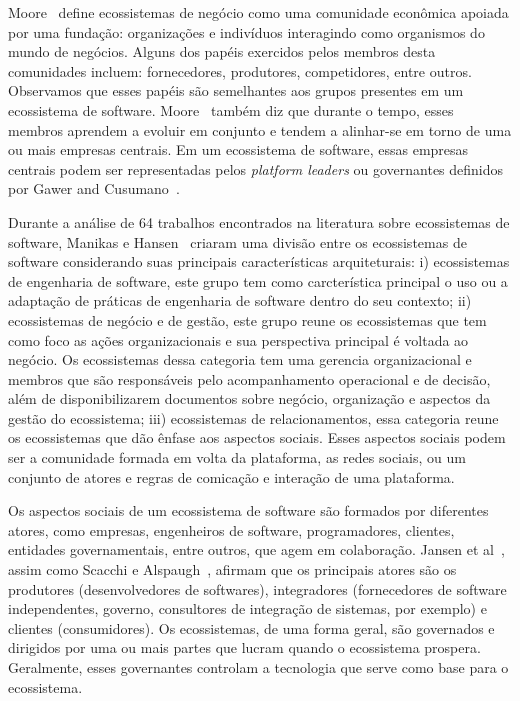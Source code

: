 \documentclass[conference]{IEEEtran}
\begin{document}
Moore~\cite{Moore1996} define ecossistemas de negócio como uma comunidade econômica apoiada por uma fundação: organizações e indivíduos interagindo como organismos do mundo de negócios. Alguns dos papéis exercidos pelos membros desta comunidades incluem: fornecedores, produtores, competidores, entre outros. Observamos que esses papéis são semelhantes aos grupos presentes em um ecossistema de software. Moore~\cite{Moore1996} também diz que durante o tempo, esses membros aprendem a evoluir em conjunto e tendem a alinhar-se em torno de uma ou mais empresas centrais. Em um ecossistema de software, essas empresas centrais podem ser representadas pelos \emph{platform leaders} ou governantes definidos por Gawer and Cusumano~\cite{Gawer2002}.

Durante a análise de 64 trabalhos encontrados na literatura sobre ecossistemas de software, Manikas e Hansen~\cite{Manikas2013} criaram uma divisão entre os ecossistemas de software considerando suas principais características arquiteturais: i) ecossistemas de engenharia de software, este grupo tem como carcterística principal o uso ou a adaptação de práticas de engenharia de software dentro do seu contexto; ii) ecossistemas de negócio e de gestão, este grupo reune os ecossistemas que tem como foco as ações organizacionais e sua perspectiva principal é voltada ao negócio. Os ecossistemas dessa categoria tem uma gerencia organizacional e membros que são responsáveis pelo acompanhamento operacional e de decisão, além de disponibilizarem documentos sobre negócio, organização e aspectos da gestão do ecossistema; iii) ecossistemas de relacionamentos, essa categoria reune os ecossistemas que dão ênfase aos aspectos sociais. Esses aspectos sociais podem ser a comunidade formada em volta da plataforma, as redes sociais, ou um conjunto de atores e regras de comicação e interação de uma plataforma.

Os aspectos sociais de um ecossistema de software são formados por diferentes atores, como empresas, engenheiros de software, programadores, clientes, entidades governamentais, entre outros, que agem em colaboração. Jansen et al~\cite{Jansen2013}, assim como Scacchi e Alspaugh~\cite{Scacchi2012}, afirmam que os principais atores são os produtores (desenvolvedores de softwares), integradores (fornecedores de software independentes, governo, consultores de integração de sistemas, por exemplo) e clientes (consumidores). Os ecossistemas, de uma forma geral, são governados e dirigidos por uma ou mais partes que lucram quando o ecossistema prospera. Geralmente, esses governantes controlam a tecnologia que serve como base para o ecossistema.
\end{document}
